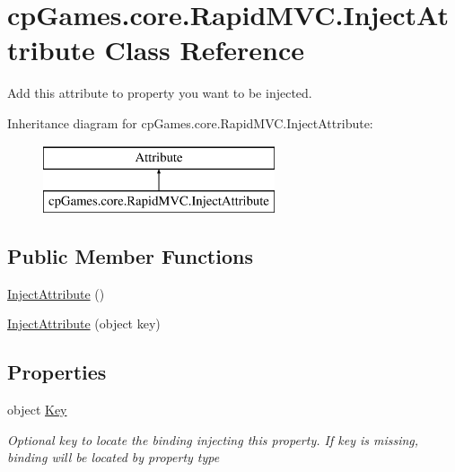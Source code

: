 \hypertarget{classcp_games_1_1core_1_1_rapid_m_v_c_1_1_inject_attribute}{}\section{cp\+Games.\+core.\+Rapid\+M\+V\+C.\+Inject\+Attribute Class Reference}
\label{classcp_games_1_1core_1_1_rapid_m_v_c_1_1_inject_attribute}


Add this attribute to property you want to be injected.  


Inheritance diagram for cp\+Games.\+core.\+Rapid\+M\+V\+C.\+Inject\+Attribute\+:\begin{figure}[H]
\begin{center}
\leavevmode
\includegraphics[height=2.000000cm]{classcp_games_1_1core_1_1_rapid_m_v_c_1_1_inject_attribute}
\end{center}
\end{figure}
\subsection*{Public Member Functions}
\begin{DoxyCompactItemize}
\item 
\mbox{\hyperlink{classcp_games_1_1core_1_1_rapid_m_v_c_1_1_inject_attribute_a0c4bfc820f7eb0089bbff9b2ab45c7d0}{Inject\+Attribute}} ()
\item 
\mbox{\hyperlink{classcp_games_1_1core_1_1_rapid_m_v_c_1_1_inject_attribute_af731787df83cc1c0e664c2f97c97170c}{Inject\+Attribute}} (object key)
\end{DoxyCompactItemize}
\subsection*{Properties}
\begin{DoxyCompactItemize}
\item 
object \mbox{\hyperlink{classcp_games_1_1core_1_1_rapid_m_v_c_1_1_inject_attribute_a31cad4210e35805fc8443756c8e268e1}{Key}}
\begin{DoxyCompactList}\small\item\em Optional key to locate the binding injecting this property. If key is missing, binding will be located by property type \end{DoxyCompactList}\end{DoxyCompactItemize}


